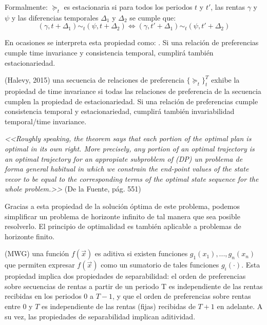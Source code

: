 \documentclass{nuevotema}
\begin{document}
Formalmente: $\succeq_t$ es estacionaria si para todos los periodos $t$ y $t'$, las rentas $\gamma$ y $\psi$ y las diferencias temporales $\Delta_1$ y $\Delta_2$ se cumple que:
\begin{equation}
    \left( \gamma, t + \Delta_1 \right) \sim_t \left( \psi , t + \Delta_2 \right) \iff \left( \gamma , t' + \Delta_1 \right) \sim_t \left( \psi , t' + \Delta_2 \right)
\end{equation}

En ocasiones se interpreta esta propiedad como: . Si una relación de preferencias cumple time invariance y consistencia temporal, cumplirá también estacionariedad.


(Halevy, 2015) una secuencia de relaciones de preferencia $\{ \succeq_t \}_t^T$ exhibe la propiedad de time invariance si todas las relaciones de preferencia de la secuencia cumplen la propiedad de estacionariedad. Si una relación de preferencias cumple consistencia temporal y estacionariedad, cumplirá también invariabilidad temporal/time invariance.


\textit{<<Roughly speaking, the theorem says that each portion of the optimal plan is optimal in its own right. More precisely, any portion of an optimal trajectory is an optimal trajectory for an appropiate subproblem of (DP) \lbrack \textrm{un problema de forma general habitual} \rbrack in which we constrain the end-point values of the state vecor to be equal to the corresponding terms of the optimal state sequence for the whole problem.>>} (De la Fuente, pág. 551)

Gracias a esta propiedad de la solución óptima de este problema, podemos simplificar un problema de horizonte infinito de tal manera que sea posible resolverlo. El principio de optimalidad es también aplicable a problemas de horizonte finito.


(MWG) una función $f(\vec{x})$ es aditiva si existen funciones $g_1(x_1), ..., g_n(x_n)$ que permiten expresar $f(\vec{x})$ como un sumatorio de tales funciones $g_i(\cdot)$. Esta propiedad implica dos propiedades de separabilidad: el orden de preferencias sobre secuencias de rentas a partir de un periodo T es independiente de las rentas recibidas en los periodos $0$ a $T-1$, y que el orden de preferencias sobre rentas entre $0$ y $T$ es independiente de las rentas (fijas) recibidas de $T+1$ en adelante. A su vez, las propiedades de separabilidad implican aditividad. 
\end{document}
